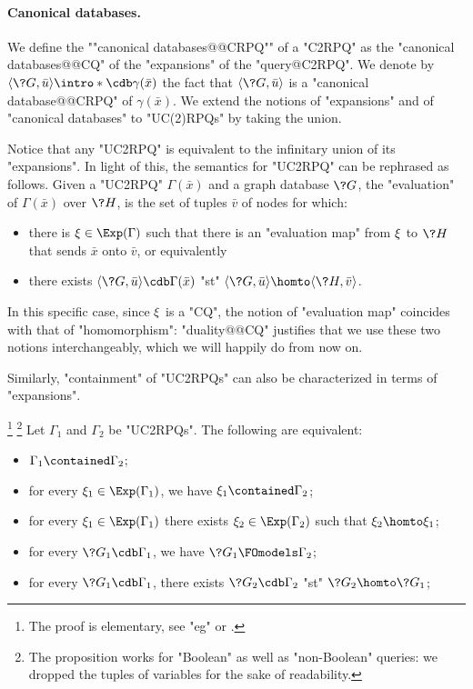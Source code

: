 \paragraph{Canonical databases.}
We define the \AP""canonical databases@@CRPQ"" of a "C2RPQ" as the "canonical databases@@CQ"
of the "expansions" of the "query@C2RPQ". We denote by
\AP$\tup{\?G,\bar u} \intro*\cdb \gamma(\bar x)$
the fact that $\tup{\?G,\bar u}$ is a "canonical database@@CRPQ" of $\gamma(\bar x)$.
We extend the notions of "expansions" and of "canonical databases" to "UC(2)RPQs" by
taking the union.

Notice that any "UC2RPQ" is equivalent to the infinitary union of its "expansions". In light of this, the semantics for "UC2RPQ" can be rephrased as follows. 
Given a "UC2RPQ" $\Gamma(\bar x)$ and a graph database $\?G$, 
the "evaluation" of $\Gamma(\bar x)$ over $\?H$, is the set of tuples 
$\bar{v}$ of nodes for which:
\begin{itemize}
    \item there is $\anexpansion \in \Exp(\Gamma)$ such that there is an "evaluation map" from $\xi$ to $\?H$ that sends $\bar x$ onto $\bar v$, or equivalently
    \item there exists $\tup{\?G, \bar u} \cdb \Gamma(\bar x)$ "st"
    $\tup{\?G, \bar u} \homto \tup{\?H, \bar v}$.
\end{itemize}
In this specific case, since $\xi$ is a "CQ", the notion of "evaluation map"
coincides with that of "homomorphism":
"duality@@CQ" justifies that we use these two notions interchangeably, which we will
happily do from now on.

Similarly, "containment" of "UC2RPQs" can also be characterized in terms of "expansions".
\begin{proposition}[Folklore]
    \!\footnote[][-3cm]{The proof is elementary,
    see "eg" \cite[Proposition 3.2]{FlorescuLevySuciu1998Containment} 
    or \cite[Theorem 2]{CalvaneseDeGiacomoLenzeriniVardi2000Containment}.}%
    \footnote{The proposition works for "Boolean" as well as "non-Boolean" queries:
    we dropped the tuples of variables for the sake of readability.}
    \AP\label{prop:cont-char-exp-st}
    Let $\Gamma_1$ and $\Gamma_2$ be "UC2RPQs". The following are equivalent:
    \begin{itemize}
        \item $\Gamma_1 \contained \Gamma_2$;
        \item for every $\anexpansion_1\in \Exp(\Gamma_1)$, we have $\anexpansion_1 \contained \Gamma_2$;
        \item for every $\anexpansion_1\in \Exp(\Gamma_1)$ there exists $\anexpansion_2\in \Exp(\Gamma_2)$ such that $\anexpansion_2\homto \anexpansion_1$;
        \item for every $\?G_1 \cdb \Gamma_1$, we have $\?G_1 \FOmodels \Gamma_2$;
        \item for every $\?G_1 \cdb \Gamma_1$, there exists $\?G_2 \cdb \Gamma_2$
        "st" $\?G_2 \homto \?G_1$;
    \end{itemize}
\end{proposition}

